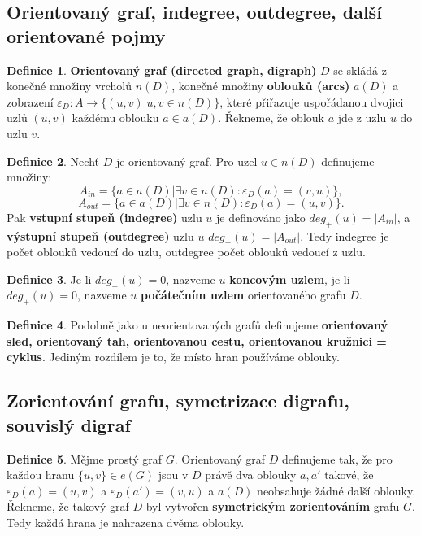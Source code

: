 \documentclass[a4]{report}
\theoremstyle{definition}
\newtheorem{definition}{Definice}[section]
\begin{document}
\subsection{Orientovaný graf, indegree, outdegree, další orientované pojmy}

\begin{definition}
\textbf{Orientovaný graf (directed graph, digraph)} $D$ se skládá z konečné množiny vrcholů $n(D)$, konečné množiny \textbf{oblouků (arcs)} $a(D)$ a zobrazení $\varepsilon_D : A \rightarrow \{ (u, v) | u,v \in n(D) \}$, které přiřazuje uspořádanou dvojici uzlů $(u,v)$ každému oblouku $a \in a(D)$. Řekneme, že oblouk $a$ jde z uzlu $u$ do uzlu $v$.
\end{definition}

\begin{definition}
Nechť $D$ je orientovaný graf. Pro uzel $u \in n(D)$ definujeme množiny:
$$ A_{in} = \{ a \in a(D) | \exists v \in n(D) : \varepsilon_D (a) = (v, u) \},$$
$$A_{out} = \{ a \in a(D) | \exists v \in n(D) : \varepsilon_D (a) = (u, v) \}.$$
Pak \textbf{vstupní stupeň (indegree)} uzlu $u$ je definováno jako $deg_+ (u) = |A_{in}|$, a \textbf{výstupní stupeň (outdegree)} uzlu $u$ $deg_- (u) = |A_{out}|$. Tedy indegree je počet oblouků vedoucí do uzlu, outdegree počet oblouků vedoucí z uzlu.
\end{definition}

\begin{definition}
Je-li $deg_- (u) = 0$, nazveme $u$ \textbf{koncovým uzlem}, je-li $deg_+ (u) = 0$, nazveme $u$ \textbf{počátečním uzlem} orientovaného grafu $D$.
\end{definition}

\begin{definition}
Podobně jako u neorientovaných grafů definujeme \textbf{orientovaný sled, orientovaný tah, orientovanou cestu, orientovanou kružnici = cyklus}. Jediným rozdílem je to, že místo hran používáme oblouky.
\end{definition}

\subsection{Zorientování grafu, symetrizace digrafu, souvislý digraf}

\begin{definition}
Mějme prostý graf $G$. Orientovaný graf $D$ definujeme tak, že pro každou hranu $\{ u, v\} \in e(G)$ jsou v $D$ právě dva oblouky $a, a'$ takové, že $\varepsilon_D (a) = (u, v)$ a $\varepsilon_D (a') = (v,u)$ a $a(D)$ neobsahuje žádné další oblouky. Řekneme, že takový graf $D$ byl vytvořen \textbf{ symetrickým zorientováním} grafu $G$. Tedy každá hrana je nahrazena dvěma oblouky.
\end{definition}
\end{document}
